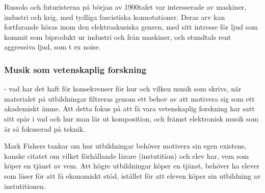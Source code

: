 \documentclass{article}
\begin{document}

  Russolo och futuristerna på början av 1900talet var intersserade av maskiner, industri och krig, med tydliga
  fascistiska konnotationer. Deras arv kan fortfarande höras inom den elektroakusiska genren, med sitt
  intresse för ljud som kommit som biprodukt ur industri och från maskiner, och stundtals rent aggressiva
  ljud, som t ex noise. 




\subsubsection{Musik som vetenskaplig forskning}
- vad har det haft för konsekvenser för hur och vilken musik som skrivs, när materialet på utbildningar filtreras
  genom ett behov av att motivera sig som ett akademiskt ämne. Att detta fokus på att få vara vetenskaplig
  forskning har satt sitt spår i vad och hur man lär ut komposition, och främst elektronisk musik som är så
  fokuserad på teknik. 

  Mark Fishers tankar om hur utbildningar behöver motivera sin egen existens, kanske citatet om vilket
  förhållande lärare (instutition) och elev har, vem som köper en tjänst av vem. Att högre utbildningar
  köper en tjänst, behöver ha elever som läser för att få ekonomiskt stöd, istället för att eleven köper sin
  utbildning av instutitionen. 

	




\end{document}

